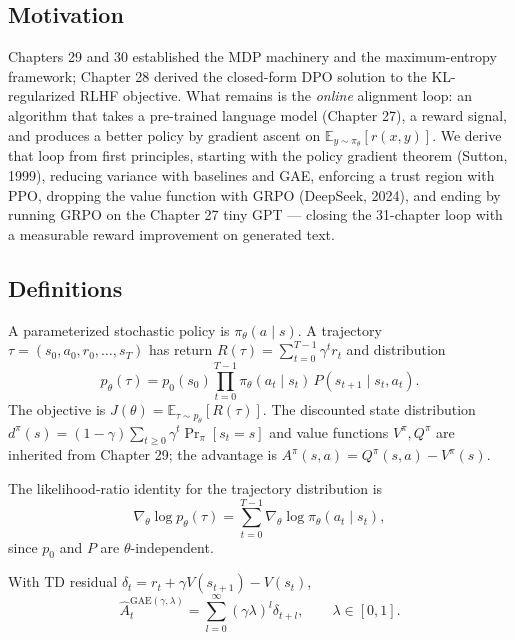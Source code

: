 \subsection*{Motivation}

Chapters 29 and 30 established the MDP machinery and the maximum-entropy framework; Chapter 28 derived the closed-form DPO solution to the KL-regularized RLHF objective. What remains is the \emph{online} alignment loop: an algorithm that takes a pre-trained language model (Chapter 27), a reward signal, and produces a better policy by gradient ascent on $\mathbb{E}_{y\sim\pi_\theta}[r(x,y)]$. We derive that loop from first principles, starting with the policy gradient theorem (Sutton, 1999), reducing variance with baselines and GAE, enforcing a trust region with PPO, dropping the value function with GRPO (DeepSeek, 2024), and ending by running GRPO on the Chapter 27 tiny GPT — closing the 31-chapter loop with a measurable reward improvement on generated text.

\subsection*{Definitions}

\begin{definition}
A parameterized stochastic policy is $\pi_\theta(a\mid s)$. A trajectory $\tau=(s_0,a_0,r_0,\ldots,s_T)$ has return $R(\tau)=\sum_{t=0}^{T-1}\gamma^t r_t$ and distribution
\[
p_\theta(\tau)=p_0(s_0)\prod_{t=0}^{T-1}\pi_\theta(a_t\mid s_t)\,P(s_{t+1}\mid s_t,a_t).
\]
The objective is $J(\theta)=\mathbb{E}_{\tau\sim p_\theta}[R(\tau)]$. The discounted state distribution $d^\pi(s)=(1-\gamma)\sum_{t\geq 0}\gamma^t \Pr_\pi[s_t=s]$ and value functions $V^\pi,Q^\pi$ are inherited from Chapter 29; the advantage is $A^\pi(s,a)=Q^\pi(s,a)-V^\pi(s)$.
\end{definition}

\begin{definition}
The likelihood-ratio identity for the trajectory distribution is
\[
\nabla_\theta\log p_\theta(\tau)=\sum_{t=0}^{T-1}\nabla_\theta\log\pi_\theta(a_t\mid s_t),
\]
since $p_0$ and $P$ are $\theta$-independent.
\end{definition}

\begin{definition}
With TD residual $\delta_t=r_t+\gamma V(s_{t+1})-V(s_t)$,
\[
\hat A_t^{\mathrm{GAE}(\gamma,\lambda)}=\sum_{l=0}^{\infty}(\gamma\lambda)^l\delta_{t+l},\qquad \lambda\in[0,1].
\]
\end{definition}


